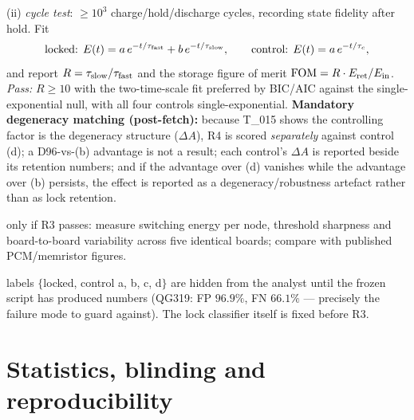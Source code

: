 \documentclass[11pt,a4paper]{article}
\begin{document}
\begin{description}[leftmargin=1.2em,style=nextline]
(ii) \emph{cycle test}: $\ge10^3$ charge/hold/discharge cycles, recording state fidelity after hold.
Fit
\[
\text{locked: } E(t)=a\,e^{-t/\tau_{\rm fast}}+b\,e^{-t/\tau_{\rm slow}},
\qquad
\text{control: } E(t)=a\,e^{-t/\tau_c},
\]
and report $R=\tau_{\rm slow}/\tau_{\rm fast}$ and the storage figure of merit
$\mathrm{FOM}=R\cdot E_{\rm ret}/E_{\rm in}$. \emph{Pass:} $R\ge10$ with the two-time-scale fit
preferred by BIC/AIC against the single-exponential null, with all four controls
single-exponential. \textbf{Mandatory degeneracy matching (post-fetch):} because T\_015 shows the
controlling factor is the degeneracy structure ($\Delta A$), R4 is scored \emph{separately} against
control (d); a D96-vs-(b) advantage is not a result; each control's $\Delta A$ is reported beside its
retention numbers; and if the advantage over (d) vanishes while the advantage over (b) persists, the
effect is reported as a degeneracy/robustness artefact rather than as lock retention.
\item[R5 --- threshold benchmark (H4, optional)] only if R3 passes: measure switching energy per
node, threshold sharpness and board-to-board variability across five identical boards; compare with
published PCM/memristor figures.
\item[R6 --- controls and blinding] labels $\{$locked, control a, b, c, d$\}$ are hidden from the
analyst until the frozen script has produced numbers (QG319: FP $96.9\%$, FN $66.1\%$ --- precisely
the failure mode to guard against). The lock classifier itself is fixed before R3.
\end{description}

\section{Statistics, blinding and reproducibility}
\end{document}
